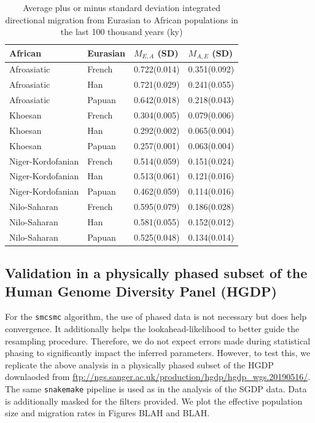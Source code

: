 \documentclass{article}
\begin{document}
\begin{table}[ht]
	\centering
	\begin{tabular}{llll}
		\hline
		African & Eurasian & $M_{E, A}$ (SD) & $M_{A, E}$ (SD) \\ 
		\hline
		Afroasiatic & French & 0.722(0.014) & 0.351(0.092) \\ 
		Afroasiatic & Han & 0.721(0.029) & 0.241(0.055) \\ 
		Afroasiatic & Papuan & 0.642(0.018) & 0.218(0.043) \\ 
		Khoesan & French & 0.304(0.005) & 0.079(0.006) \\ 
		Khoesan & Han & 0.292(0.002) & 0.065(0.004) \\ 
		Khoesan & Papuan & 0.257(0.001) & 0.063(0.004) \\ 
		Niger-Kordofanian & French & 0.514(0.059) & 0.151(0.024) \\ 
		Niger-Kordofanian & Han & 0.513(0.061) & 0.121(0.016) \\ 
		Niger-Kordofanian & Papuan & 0.462(0.059) & 0.114(0.016) \\ 
		Nilo-Saharan & French & 0.595(0.079) & 0.186(0.028) \\ 
		Nilo-Saharan & Han & 0.581(0.055) & 0.152(0.012) \\ 
		Nilo-Saharan & Papuan & 0.525(0.048) & 0.134(0.014) \\ 
		\hline
	\end{tabular}
	\caption{Average plus or minus standard deviation integrated directional migration from Eurasian to African populations in the last 100 thousand years (ky)} 
	\label{average_sgdp_migration_table}
\end{table}

\subsection{Validation in a physically phased subset of the Human Genome Diversity Panel (HGDP)} \label{hgdp_section}

For the {\tt smcsmc} algorithm, the use of phased data is not necessary but does help convergence. It additionally helps the lookahead-likelihood to better guide the resampling procedure. Therefore, we do not expect errors made during statistical phasing to significantly impact the inferred parameters. However, to test this, we replicate the above analysis in a physically phased subset of the HGDP downlaoded from \url{ftp://ngs.sanger.ac.uk/production/hgdp/hgdp_wgs.20190516/}. The same {\tt snakemake} pipeline is used as in the analysis of the SGDP data. Data is additionally masked for the filters provided. We plot the effective population size and migration rates in Figures BLAH and BLAH.
\end{document}
